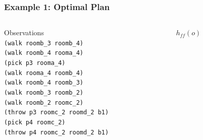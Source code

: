 \documentclass{beamer}
\begin{document}
\begin{frame}[c]\frametitle{Example 1: Optimal Plan}
	\begin{columns}
		\begin{column}[t]{0.5\textwidth}
			{\Large Observations}\\
			\texttt{(walk roomb\_3 roomb\_4)}\\
			\texttt{(walk roomb\_4 rooma\_4)}\\
			\texttt{(pick p3 rooma\_4)}\\
			\texttt{(walk rooma\_4 roomb\_4)}\\
			\texttt{(walk roomb\_4 roomb\_3)}\\
			\texttt{(walk roomb\_3 roomb\_2)}\\
			\texttt{(walk roomb\_2 roomc\_2)}\\
			\texttt{(throw p3 roomc\_2 roomd\_2 b1)}\\
			\texttt{(pick p4 roomc\_2)}\\
			\texttt{(throw p4 roomc\_2 roomd\_2 b1)}\\
			
		\end{column}
		\begin{column}[t]{0.5\textwidth}
			{\Large $h_{\mathit{ff}}(o)$}
		\end{column}
	\end{columns}
\end{frame}
\end{document}
